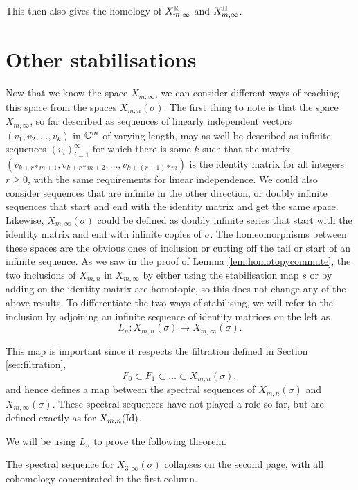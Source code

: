 This then also gives the homology of $X_{m,\infty}^{\mathbb{R}}$ and
$X_{m,\infty}^{\mathbb{H}}$.


\section{Other stabilisations}
\label{sec:stabilitet}

Now that we know the space $X_{m,\infty}$, we can consider different
ways of reaching this space from the spaces $X_{m,n}(\sigma)$. The
first thing to note is that the space $X_{m,\infty}$, so far described
as sequences of linearly independent vectors $(v_1,v_2,\dots,v_k)$ in
$\mathbb{C}^m$ of varying length, may as well be described as infinite
sequences $(v_i)_{i=1}^\infty$ for which there is some $k$ such that
the matrix $(v_{k+r*m +1},v_{k+r*m +2},\dots,v_{k+(r+1)*m})$ is the
identity matrix for all integers $r \geq 0$, with the same
requirements for
linear independence. We could also consider sequences that are
infinite in the other direction, or
doubly infinite sequences
that start and end with the identity matrix
and get the same space. Likewise, $X_{m,\infty}(\sigma)$ could be
defined as doubly infinite series that start with the identity matrix
and end with infinite copies of $\sigma$. The homeomorphisms between
these spaces are the obvious ones of inclusion or cutting off the tail
or start of an infinite sequence. As we saw in the proof of Lemma
\ref{lem:homotopycommute}, the two inclusions of $X_{m,n}$ in
$X_{m,\infty}$ by either
using the stabilisation map $s$ or by adding on the identity matrix
are homotopic, so this does not change any of the above results. To
differentiate the two ways of stabilising, we will refer to the
inclusion by adjoining an
infinite sequence of identity matrices on the left as
\[ L_n : X_{m,n}(\sigma) \to X_{m,\infty}(\sigma). \]

This map is important since it respects the
filtration defined in Section \ref{sec:filtration},
\[ F_0 \subset F_1 \subset \dots \subset X_{m,n}(\sigma), \]
and hence defines a map between the spectral sequences of
$X_{m,n}(\sigma)$ and $X_{m,\infty}(\sigma)$. These spectral sequences
have not played a role so far, but are defined exactly as for
$X_{m,n}(\operatorname{Id})$.

We will be using $L_n$ to prove the following theorem.
\begin{theorem}
  \label{thm:kollaps}
  The spectral sequence for $X_{3,\infty}(\sigma)$ collapses on the
  second page, with all cohomology concentrated in the first column.
\end{theorem}

